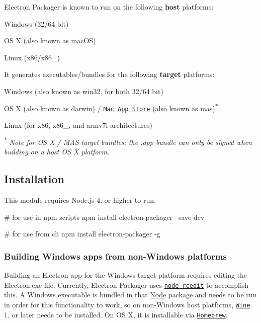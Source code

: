 Electron Packager is known to run on the following {\bfseries host} platforms\+:


\begin{DoxyItemize}
\item Windows (32/64 bit)
\item OS X (also known as mac\+OS)
\item Linux (x86/x86\+\_)
\end{DoxyItemize}

It generates executables/bundles for the following {\bfseries target} platforms\+:


\begin{DoxyItemize}
\item Windows (also known as {\ttfamily win32}, for both 32/64 bit)
\item OS X (also known as {\ttfamily darwin}) / \href{http://electron.atom.io/docs/v0.36.0/tutorial/mac-app-store-submission-guide/}{\tt Mac App Store} (also known as {\ttfamily mas})\textsuperscript{$\ast$}
\item Linux (for x86, x86\+\_, and armv7l architectures)
\end{DoxyItemize}

\textsuperscript{$\ast$} {\itshape Note for OS X / M\+AS target bundles\+: the {\ttfamily .app} bundle can only be signed when building on a host OS X platform.}

\subsection*{Installation}

This module requires Node.\+js 4. or higher to run.


\begin{DoxyCode}
# for use in npm scripts
npm install electron-packager --save-dev

# for use from cli
npm install electron-packager -g
\end{DoxyCode}


\subsubsection*{Building Windows apps from non-\/\+Windows platforms}

Building an Electron app for the Windows target platform requires editing the {\ttfamily Electron.\+exe} file. Currently, Electron Packager uses \href{https://github.com/atom/node-rcedit}{\tt node-\/rcedit} to accomplish this. A Windows executable is bundled in that \mbox{\hyperlink{classNode}{Node}} package and needs to be run in order for this functionality to work, so on non-\/\+Windows host platforms, \href{https://www.winehq.org/}{\tt Wine} 1. or later needs to be installed. On OS X, it is installable via \href{http://brew.sh/}{\tt Homebrew}.


